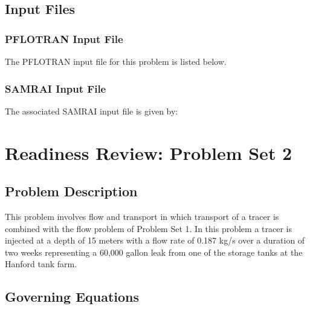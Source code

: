 \documentclass[12pt]{article}
\begin{document}
\subsection{Input Files}

\subsubsection{PFLOTRAN Input File}

The PFLOTRAN input file for this problem is listed below.

\tiny



\normalsize

\subsubsection{SAMRAI Input File}

The associated SAMRAI input file is given by:

\tiny




\normalsize

\section{Readiness Review: Problem Set 2}

\subsection{Problem Description}

This problem involves flow and transport in which transport of a tracer is combined with the flow problem of Problem Set 1. In this problem a tracer is injected at a depth of 15 meters with a flow rate of 0.187 kg/s over a duration of two weeks representing a 60,000 gallon leak from one of the storage tanks at the Hanford tank farm.

\subsection{Governing Equations}
\end{document}
